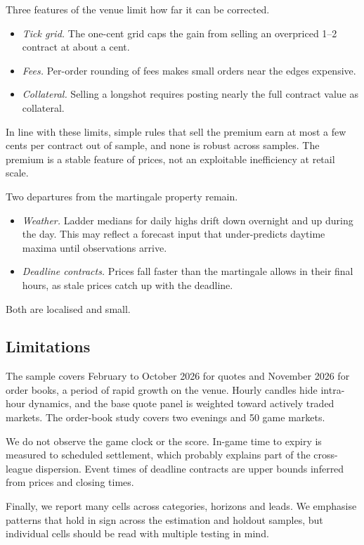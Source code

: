 Three features of the venue limit how far it can be corrected.
\begin{itemize}
  \item \emph{Tick grid.} The one-cent grid caps the gain from selling an overpriced 1--2\cents
  contract at about a cent.
  \item \emph{Fees.} Per-order rounding of fees makes small orders near the edges expensive.
  \item \emph{Collateral.} Selling a longshot requires posting nearly the full contract value as
  collateral.
\end{itemize}
In line with these limits, simple rules that sell the premium earn at most a few cents per contract
out of sample, and none is robust across samples. The premium is a stable feature of prices, not
an exploitable inefficiency at retail scale.

Two departures from the martingale property remain.
\begin{itemize}
  \item \emph{Weather.} Ladder medians for daily highs drift down overnight and up during the day.
  This may reflect a forecast input that under-predicts daytime maxima until observations arrive.
  \item \emph{Deadline contracts.} Prices fall faster than the martingale allows in their final
  hours, as stale prices catch up with the deadline.
\end{itemize}
Both are localised and small.

\subsection{Limitations}

The sample covers February to October 2026 for quotes and November 2026 for order books, a period
of rapid growth on the venue. Hourly candles hide intra-hour dynamics, and the base quote panel is
weighted toward actively traded markets. The order-book study covers two evenings and 50 game
markets.

We do not observe the game clock or the score. In-game time to expiry is measured to scheduled
settlement, which probably explains part of the cross-league dispersion. Event times of deadline
contracts are upper bounds inferred from prices and closing times.

Finally, we report many cells across categories, horizons and leads. We emphasise patterns that
hold in sign across the estimation and holdout samples, but individual cells should be read with
multiple testing in mind.
